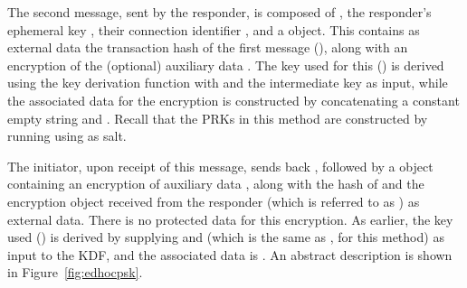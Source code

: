 {The second message, sent by the responder, is composed of \mCi, the responder's
ephemeral key \mGy, their connection identifier \mCr, and a \mCose{} object.
This contains as external data the transaction hash of the first message
(\mTHtwo), along with an \mAead{} encryption of the (optional) auxiliary data
\mADtwo. The key used for this (\mKtwoae) is derived using the \mEdhoc{} key
derivation function with \mTHtwo{} and the intermediate key \mPRKtwo{} as input,
while the associated data for the \mAead{} encryption is constructed by
concatenating a constant empty string and \mTHtwo. Recall that the PRKs in this method are constructed by running \mHkdfExtract{} using \mPsk{} as salt. 

The initiator, upon receipt of this message, sends back \mCr, followed by a
\mCose{} object containing an \mAead{} encryption of auxiliary data \mADthree,
along with the hash of \mTHtwo{} and the encryption object received from the
responder (which is referred to as \mTHthree) as external data. There is no
protected data for this encryption. As earlier, the key used (\mKthreeae) is
derived by supplying \mTHthree{} and \mPRKthree{} (which is the same as \mPRKtwo, for this method) as input to the KDF, and the associated data is \mTHthree. An abstract description is shown in Figure~\ref{fig:edhocpsk}.

}
